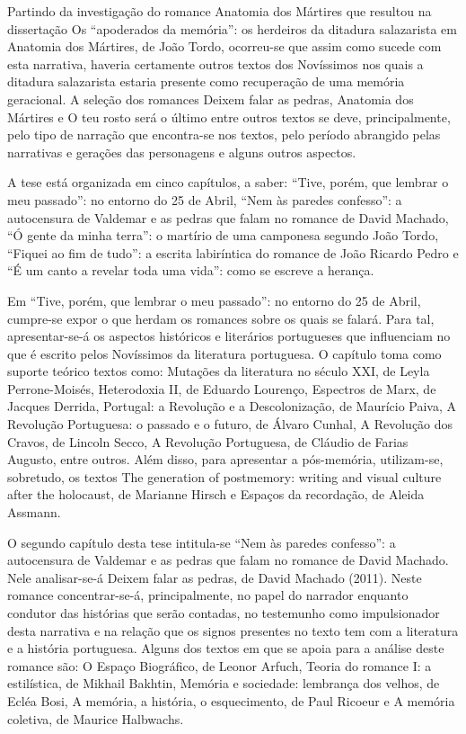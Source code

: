 \documentclass[../DISSERTACAO_MAIN.tex]{subfiles}
\begin{document}
Partindo da investigação do romance Anatomia dos Mártires que resultou na dissertação Os “apoderados da memória”: os herdeiros da ditadura salazarista em Anatomia dos Mártires, de João Tordo, ocorreu-se que assim como sucede com esta narrativa, haveria certamente outros textos dos Novíssimos nos quais a ditadura salazarista estaria presente como recuperação de uma memória geracional. A seleção dos romances Deixem falar as pedras, Anatomia dos Mártires e O teu rosto será o último entre outros textos se deve, principalmente, pelo tipo de narração que encontra-se nos textos, pelo período abrangido pelas narrativas e gerações das personagens e alguns outros aspectos.

A tese está organizada em cinco capítulos, a saber: “Tive, porém, que lembrar o meu passado”: no entorno do 25 de Abril, “Nem às paredes confesso”: a autocensura de Valdemar e as pedras que falam no romance de David Machado, “Ó gente da minha terra”: o martírio de uma camponesa segundo João Tordo, “Fiquei ao fim de tudo”: a escrita labiríntica do romance de João Ricardo Pedro e “É um canto a revelar toda uma vida”: como se escreve a herança.

Em “Tive, porém, que lembrar o meu passado”: no entorno do 25 de Abril, cumpre-se expor o que herdam os romances sobre os quais se falará. Para tal, apresentar-se-á os aspectos históricos e literários portugueses que influenciam no que é escrito pelos Novíssimos da literatura portuguesa. O capítulo toma como suporte teórico textos como: Mutações da literatura no século XXI, de Leyla Perrone-Moisés, Heterodoxia II, de Eduardo Lourenço, Espectros de Marx, de Jacques Derrida, Portugal: a Revolução e a Descolonização, de Maurício Paiva, A Revolução Portuguesa: o passado e o futuro, de Álvaro Cunhal, A Revolução dos Cravos, de Lincoln Secco, A Revolução Portuguesa, de Cláudio de Farias Augusto, entre outros. Além disso, para apresentar a pós-memória, utilizam-se, sobretudo, os textos The generation of postmemory: writing and visual culture after the holocaust, de Marianne Hirsch e Espaços da recordação, de Aleida Assmann. 

O segundo capítulo desta tese intitula-se “Nem às paredes confesso”: a autocensura de Valdemar e as pedras que falam no romance de David Machado. Nele analisar-se-á Deixem falar as pedras, de David Machado (2011). Neste romance concentrar-se-á, principalmente, no papel do narrador enquanto condutor das histórias que serão contadas, no testemunho como impulsionador desta narrativa e na relação que os signos presentes no texto tem com a literatura e a história portuguesa. Alguns dos textos em que se apoia para a análise deste romance são: O Espaço Biográfico, de Leonor Arfuch, Teoria do romance I: a estilística, de Mikhail Bakhtin, Memória e sociedade: lembrança dos velhos, de Ecléa Bosi, A memória, a história, o esquecimento, de Paul Ricoeur e A memória coletiva, de Maurice Halbwachs. 
\end{document}
